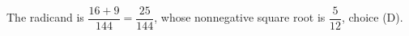 The radicand is $\dfrac{16+9}{144}=\dfrac{25}{144}$, whose nonnegative square root is $\boxed{\dfrac{5}{12}}$, choice (D).
